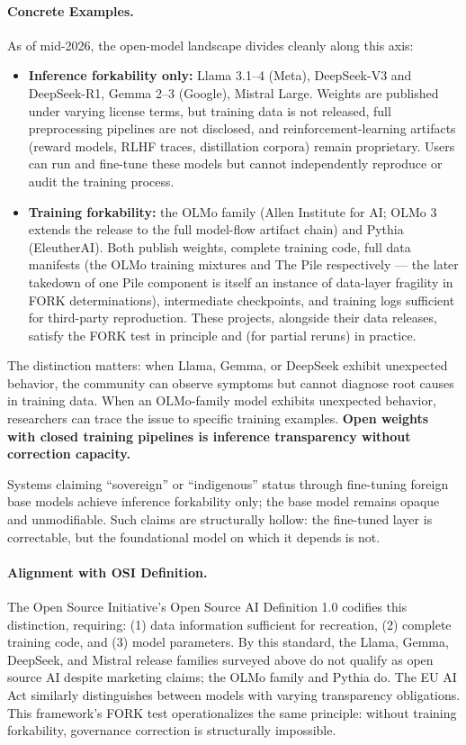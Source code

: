 \documentclass{article}
\theoremstyle{definition}
\begin{document}
\paragraph{Concrete Examples.} As of mid-2026, the open-model landscape divides cleanly along this axis:
\begin{itemize}[noitemsep]
    \item \textbf{Inference forkability only:} Llama 3.1--4 (Meta), DeepSeek-V3 and DeepSeek-R1, Gemma 2--3 (Google), Mistral Large. Weights are published under varying license terms, but training data is not released, full preprocessing pipelines are not disclosed, and reinforcement-learning artifacts (reward models, RLHF traces, distillation corpora) remain proprietary. Users can run and fine-tune these models but cannot independently reproduce or audit the training process.
    \item \textbf{Training forkability:} the OLMo family \citep{groeneveld2024} (Allen Institute for AI; OLMo 3 extends the release to the full model-flow artifact chain) and Pythia \citep{biderman2023} (EleutherAI). Both publish weights, complete training code, full data manifests (the OLMo training mixtures and The Pile \citep{gao2020} respectively --- the later takedown of one Pile component is itself an instance of data-layer fragility in FORK determinations), intermediate checkpoints, and training logs sufficient for third-party reproduction. These projects, alongside their data releases, satisfy the FORK test in principle and (for partial reruns) in practice.
\end{itemize}

The distinction matters: when Llama, Gemma, or DeepSeek exhibit unexpected behavior, the community can observe symptoms but cannot diagnose root causes in training data. When an OLMo-family model exhibits unexpected behavior, researchers can trace the issue to specific training examples. \textbf{Open weights with closed training pipelines is inference transparency without correction capacity.}

Systems claiming ``sovereign'' or ``indigenous'' status through fine-tuning foreign base models achieve inference forkability only; the base model remains opaque and unmodifiable. Such claims are structurally hollow: the fine-tuned layer is correctable, but the foundational model on which it depends is not.

\paragraph{Alignment with OSI Definition.} The Open Source Initiative's Open Source AI Definition 1.0 \citep{osi2024} codifies this distinction, requiring: (1) data information sufficient for recreation, (2) complete training code, and (3) model parameters. By this standard, the Llama, Gemma, DeepSeek, and Mistral release families surveyed above do not qualify as open source AI despite marketing claims; the OLMo family and Pythia do. The EU AI Act \citep{euaiact2024} similarly distinguishes between models with varying transparency obligations. This framework's FORK test operationalizes the same principle: without training forkability, governance correction is structurally impossible.
\end{document}
